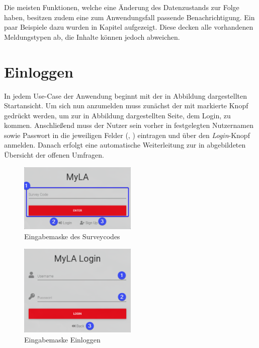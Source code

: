 Die meisten Funktionen, welche eine Änderung des Datenzustands zur Folge haben, besitzen zudem eine zum Anwendungsfall passende Benachrichtigung.
Ein paar Beispiele dazu wurden in Kapitel  aufgezeigt.
Diese decken alle vorhandenen Meldungstypen ab, die Inhalte können jedoch abweichen.

\section{Einloggen}
\label{ssec:Einloggen}

In jedem Use-Case der Anwendung beginnt mit der in Abbildung  dargestellten Startansicht.
Um sich nun anzumelden muss zunächst der mit \desTwo markierte Knopf gedrückt werden, um zur in Abbildung  dargestellten Seite, dem Login, zu kommen.
Anschließend muss der Nutzer sein vorher in  festgelegten Nutzernamen sowie Passwort in die jeweiligen Felder (\desOne, \desTwo) eintragen und über den \emph{Login}-Knopf anmelden.
Danach erfolgt eine automatische Weiterleitung zur in  abgebildeten Übersicht der offenen Umfragen.

\begin{figure}[H]
	\centering
	\includegraphics[width=0.5\textwidth, keepaspectratio]{img/guide/SurveyCode.png}
	\captionsetup{justification=centering, format=plain}
	\caption[Eingabemaske Surveycode]{Eingabemaske des Surveycodes \\\quelleScreenshot}
	\label{fig:EingabemaskeSurveycode}
\end{figure}

\begin{figure}[H]
	\centering
	\includegraphics[width=0.5\textwidth, keepaspectratio]{img/guide/Login.png}
	\captionsetup{justification=centering, format=plain}
	\caption[Eingabemaske Einloggen]{Eingabemaske Einloggen \\\quelleScreenshot}
	\label{fig:Einloggen}
\end{figure} 

